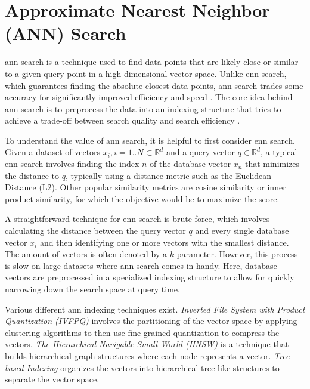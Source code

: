 
\section{Approximate Nearest Neighbor (ANN) Search}
\label{sec:fundamentals_ann_search}

\acrfull{ann} search is a technique used to find data points that are likely close or similar to a given query point in a high-dimensional vector space. Unlike \gls{enn} search, which guarantees finding the absolute closest data points, \gls{ann} search trades some accuracy for significantly improved efficiency and speed \cite{douze_faiss_2024,wu_retrieval-augmented_2024}. The core idea behind \gls{ann} search is to preprocess the data into an indexing structure that tries to achieve a trade-off between search quality and search efficiency \cite{wu_retrieval-augmented_2024}. 

To understand the value of \gls{ann} search, it is helpful to first consider \gls{enn} search. Given a dataset of vectors ${x_i, i=1..N} \subset \mathbb{R}^d$ and a query vector $q \in \mathbb{R}^d$, a typical \gls{enn} search involves finding the index $n$ of the database vector $x_n$ that minimizes the distance to $q$, typically using a distance metric such as the Euclidean Distance (L2). Other popular similarity metrics are cosine similarity or inner product similarity, for which the objective would be to maximize the score. \cite{douze_faiss_2024}

A straightforward technique for \gls{enn} search is brute force, which involves calculating the distance between the query vector $q$ and every single database vector $x_i$ and then identifying one or more vectors with the smallest distance. The amount of vectors is often denoted by a $k$ parameter. However, this process is slow on large datasets where \gls{ann} search comes in handy. Here, database vectors are preprocessed in a specialized indexing structure to allow for quickly narrowing down the search space at query time. \cite{douze_faiss_2024,wu_retrieval-augmented_2024}

Various different \gls{ann} indexing techniques exist. \emph{Inverted File System with Product Quantization (IVFPQ)} involves the partitioning of the vector space by applying clustering algorithms to then use fine-grained quantization to compress the vectors. \emph{The Hierarchical Navigable Small World (HNSW)} is a technique that builds hierarchical graph structures where each node represents a vector. \emph{Tree-based Indexing} organizes the vectors into hierarchical tree-like structures to separate the vector space. \cite{wu_retrieval-augmented_2024}
